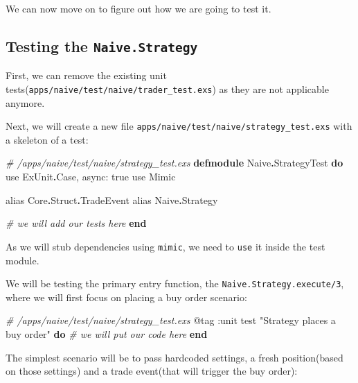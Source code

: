 \documentclass[
  oneside]{book}
\newenvironment{Shaded}{\begin{snugshade}}{\end{snugshade}}
\newcommand{\CommentTok}[1]{\textcolor[rgb]{0.56,0.35,0.01}{\textit{#1}}}
\newcommand{\ConstantTok}[1]{\textcolor[rgb]{0.56,0.35,0.01}{#1}}
\newcommand{\ImportTok}[1]{#1}
\newcommand{\KeywordTok}[1]{\textcolor[rgb]{0.13,0.29,0.53}{\textbf{#1}}}
\newcommand{\NormalTok}[1]{#1}
\newcommand{\OperatorTok}[1]{\textcolor[rgb]{0.81,0.36,0.00}{\textbf{#1}}}
\newcommand{\OtherTok}[1]{\textcolor[rgb]{0.56,0.35,0.01}{#1}}
\newcommand{\StringTok}[1]{\textcolor[rgb]{0.31,0.60,0.02}{#1}}
\newcommand{\VariableTok}[1]{\textcolor[rgb]{0.00,0.00,0.00}{#1}}
\begin{document}
We can now move on to figure out how we are going to test it.

\subsection{\texorpdfstring{Testing the \texttt{Naive.Strategy}}{Testing the Naive.Strategy}}\label{testing-the-naive.strategy}

First, we can remove the existing unit tests(\texttt{apps/naive/test/naive/trader\_test.exs}) as they are not applicable anymore.

Next, we will create a new file \texttt{apps/naive/test/naive/strategy\_test.exs} with a skeleton of a test:

\begin{Shaded}
\begin{Highlighting}[]
\CommentTok{\# /apps/naive/test/naive/strategy\_test.exs}
\KeywordTok{defmodule} \ConstantTok{Naive}\OperatorTok{.}\ConstantTok{StrategyTest} \KeywordTok{do}
  \ImportTok{use} \ConstantTok{ExUnit}\OperatorTok{.}\ConstantTok{Case}\NormalTok{, }\VariableTok{async:} \ConstantTok{true}
  \ImportTok{use} \ConstantTok{Mimic}

  \ImportTok{alias} \ConstantTok{Core}\OperatorTok{.}\ConstantTok{Struct}\OperatorTok{.}\ConstantTok{TradeEvent}
  \ImportTok{alias} \ConstantTok{Naive}\OperatorTok{.}\ConstantTok{Strategy}

  \CommentTok{\# we will add our tests here}
\KeywordTok{end}
\end{Highlighting}
\end{Shaded}

As we will stub dependencies using \texttt{mimic}, we need to \texttt{use} it inside the test module.

We will be testing the primary entry function, the \texttt{Naive.Strategy.execute/3}, where we will first focus on placing a buy order scenario:

\begin{Shaded}
\begin{Highlighting}[]
\CommentTok{\# /apps/naive/test/naive/strategy\_test.exs}
  \OtherTok{@tag} \VariableTok{:unit}
\NormalTok{  test }\StringTok{"Strategy places a buy order"} \KeywordTok{do}
    \CommentTok{\# we will put our code here}
  \KeywordTok{end}
\end{Highlighting}
\end{Shaded}

\newpage

The simplest scenario will be to pass hardcoded settings, a fresh position(based on those settings) and a trade event(that will trigger the buy order):
\end{document}
